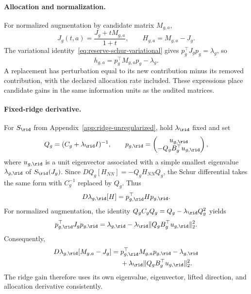 \paragraph{Allocation and normalization.}
For normalized augmentation by candidate matrix $M_{g,a}$,
\begin{equation}
J_g(t,a)=\frac{J_g+tM_{g,a}}{1+t},
\qquad H_{g,a}=M_{g,a}-J_g.
\label{eq:influence-normalized-path}
\end{equation}
The variational identity~\eqref{eq:reserve-schur-variational} gives $p_g^\top J_gp_g=\lambda_g$, so
\begin{equation}
h_{g,a}=p_g^\top M_{g,a}p_g-\lambda_g.
\label{eq:influence-normalized-gain}
\end{equation}
A replacement has perturbation equal to its new contribution minus its removed contribution, with the declared allocation rate included. These expressions place candidate gains in the same information units as the audited matrices.

\paragraph{Fixed-ridge derivative.}
For $S_{\rid}$ from Appendix~\ref{app:ridge-unregularized}, hold $\lambda_{\rid}$ fixed and set
\begin{equation}
Q_g=(C_g+\lambda_{\rid}I)^{-1},
\qquad
p_{g,\rid}=\begin{pmatrix}
u_{g,\rid}\\-Q_gB_g^\top u_{g,\rid}
\end{pmatrix},
\label{eq:influence-ridge-lift}
\end{equation}
where $u_{g,\rid}$ is a unit eigenvector associated with a simple smallest eigenvalue $\lambda_{g,\rid}$ of $S_{\rid}(J_g)$. Since $DQ_g[H_{NN}]=-Q_gH_{NN}Q_g$, the Schur differential takes the same form with $C_g^{-1}$ replaced by $Q_g$. Thus
\begin{equation}
D\lambda_{g,\rid}[H]=p_{g,\rid}^\top Hp_{g,\rid}.
\label{eq:influence-ridge-derivative}
\end{equation}
For normalized augmentation, the identity $Q_gC_gQ_g=Q_g-\lambda_{\rid}Q_g^2$ yields
\begin{equation}
p_{g,\rid}^\top J_gp_{g,\rid}
=\lambda_{g,\rid}
-\lambda_{\rid}\lVert Q_gB_g^\top u_{g,\rid}\rVert_2^2.
\label{eq:influence-ridge-baseline}
\end{equation}
Consequently,
\begin{equation}
\begin{aligned}
D\lambda_{g,\rid}[M_{g,a}-J_g]
={}&p_{g,\rid}^\top M_{g,a}p_{g,\rid}
-\lambda_{g,\rid}\\
&+\lambda_{\rid}\lVert Q_gB_g^\top u_{g,\rid}\rVert_2^2.
\end{aligned}
\label{eq:influence-ridge-normalized-gain}
\end{equation}
The ridge gain therefore uses its own eigenvalue, eigenvector, lifted direction, and allocation derivative consistently.

